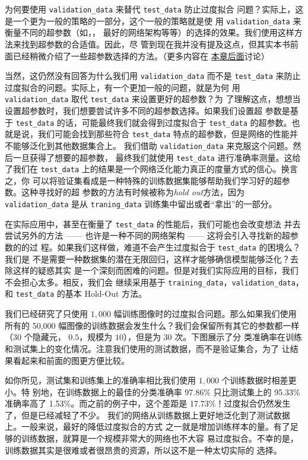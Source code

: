 \label{validation_explanation}
为何要使用 \lstinline!validation_data! 来替代 \lstinline!test_data! 防止过度拟合
问题？实际上，这是一个更为一般的策略的一部分，这个一般的策略就是使
用 \lstinline!validation_data! 来衡量不同的超参数（如\epochs{}，\learningrate{}，
最好的网络架构等等）的选择的效果。我们使用这样方法来找到超参数的合适值。因此，尽
管到现在我并没有提及这点，但其实本书前面已经稍微介绍了一些超参数选择的方法。（更多内容在%
\hyperref[sec:how_to_choose_a_neural_network's_hyper-parameters]{本章后面}讨论）

当然，这仍然没有回答为什么我们用 \lstinline!validation_data! 而不是
\lstinline!test_data! 来防止过度拟合的问题。实际上，有一个更加一般的问题，就是为何
用 \lstinline!validation_data! 取代 \lstinline!test_data! 来设置更好的超参数？为
了理解这点，想想当设置超参数时，我们想要尝试许多不同的超参数选择。如果我们设置超
参数是基于 \lstinline!test_data! 的话，可能最终我们就会得到过度拟合于
\lstinline!test_data!  的超参数。也就是说，我们可能会找到那些符合
\lstinline!test_data! 特点的超参数，但是网络的性能并不能够泛化到其他数据集合上。
我们借助 \lstinline!validation_data! 来克服这个问题。然后一旦获得了想要的超参数，
最终我们就使用 \lstinline!test_data! 进行准确率测量。这给了我们在
\lstinline!test_data! 上的结果是一个网络泛化能力真正的度量方式的信心。换言之，你
可以将验证集看成是一种特殊的训练数据集能够帮助我们学习好的超参数。这种寻找好的超
参数的方法有时候被称为\emph{hold out}方法，因为 \lstinline!validation_data! 是从
\lstinline!traning_data! 训练集中留出或者“拿出”的一部分。

在实际应用中，甚至在衡量了 \lstinline!test_data! 的性能后，我们可能也会改变想法
并去尝试另外的方法 —— 也许是一种不同的网络架构 —— 这将会引入寻找新的超参数的的过
程。如果我们这样做，难道不会产生过度拟合于 \lstinline!test_data! 的困境么？我们是
不是需要一种数据集的潜在无限回归，这样才能够确信模型能够泛化？去除这样的疑惑其实
是一个深刻而困难的问题。但是对我们实际应用的目标，我们不会担心太多。相反，我们会
继续采用基于 \lstinline!training_data!，\lstinline!validation_data!，和
\lstinline!test_data! 的基本 Hold-Out 方法。

我们已经研究了只使用 $1,000$ 幅训练图像时的过度拟合问题。那么如果我们使用所有的
50,000 幅图像的训练数据会发生什么？我们会保留所有其它的参数都一样（$30$ 个隐藏元，
  \learningrate{} $0.5$，\minibatch{}规模为 $10$），但是\epochs{}为 30 次。下图展示了分
类准确率在训练和测试集上的变化情况。注意我们使用的测试数据，而不是验证集合，为了
让结果看起来和前面的图更方便比较。

如你所见，测试集和训练集上的准确率相比我们使用 $1,000$ 个训练数据时相差更小。特
别地，在训练数据上的最佳的分类准确率 97.86\% 只比测试集上的 95.33\% 准确率高了
1.53\%。而之前的例子中，这个差距是 17.73\%！过度拟合仍然发生了，但是已经减轻了不少。
我们的网络从训练数据上更好地泛化到了测试数据上。一般来说，最好的降低过度拟合的方式
之一就是增加训练样本的量。有了足够的训练数据，就算是一个规模非常大的网络也不大容
易过度拟合。不幸的是，训练数据其实是很难或者很昂贵的资源，所以这不是一种太切实际的
选择。

